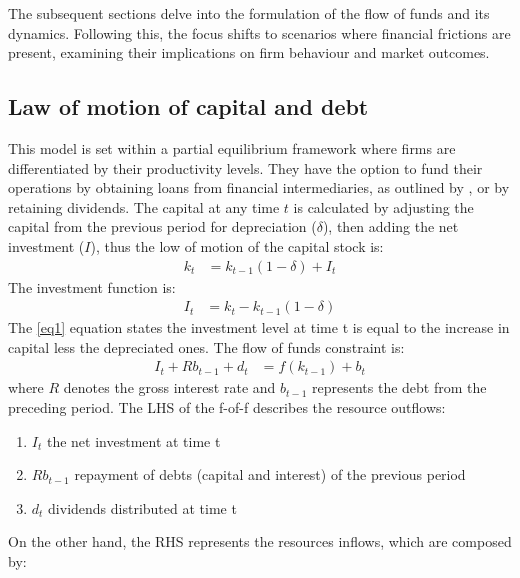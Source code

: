 \documentclass[12pt]{article}
\begin{document}
The subsequent sections delve into the formulation of the flow of funds and its dynamics. Following this, the focus
shifts to scenarios  where financial frictions are present, examining their
implications on firm behaviour and market outcomes. %

\subsection{Law of motion of capital and debt}

This model is set within a partial equilibrium framework where firms are differentiated by their productivity levels.
They have the option to fund their operations by obtaining loans from financial intermediaries, as outlined by
\cite{bernanke1995inside}, or by retaining dividends. The capital at any time \(t\) is calculated by
adjusting the capital from the previous period for depreciation (\(\delta\)), then adding the net investment (\(I\)), thus the
low of motion of the capital stock is: 
\begin{align*}
    k_t &= k_{t-1}(1 - \delta)  + I_t  
\end{align*} 
The investment function is:
\begin{align}
    I_t &= k_t - k_{t-1}\left(1-\delta\right) \label{eq1}
\end{align} 
The \ref{eq1} equation states the investment level at time t is equal to the increase in capital less the depreciated ones. 
The flow of funds constraint is:
\begin{align}
    I_t + R b_{t-1} + d_t &= f(k_{t-1}) + b_t \label{eq2}
\end{align}
where \(R\) denotes the gross interest rate and \(b_{t-1}\) represents the debt from the preceding period.
The LHS of the f-of-f describes the resource outflows: 
\begin{enumerate}
    \item \(I_t\) the net investment at time t
    \item \(R b_{t-1}\) repayment of debts (capital and interest) of the previous period
    \item \(d_t\) dividends distributed at time t
\end{enumerate}
On the other hand, the RHS represents the resources inflows, which are composed by:
\end{document}
